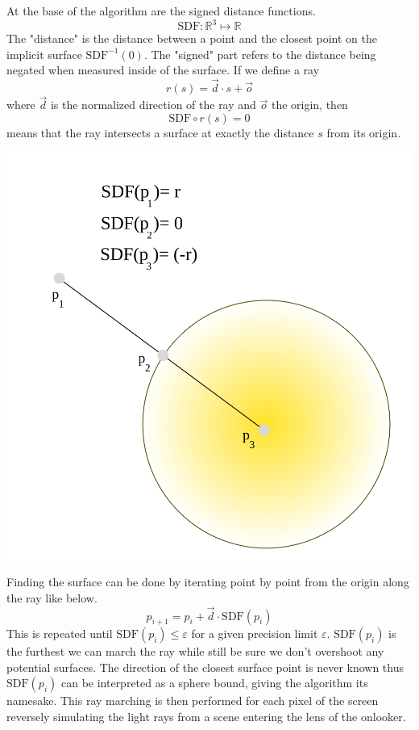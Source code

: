 \begin{minipage}{0.6\textwidth} 

    At the base of the algorithm are the signed distance functions.
    $$\text{SDF}:\mathbb{R}^{3}\mapsto\mathbb{R}$$ The "distance" is the
    distance between a point and the closest point on the implicit surface
    $\text{SDF}^{-1}(0)$. The "signed" part refers to the distance being
    negated when measured inside of the surface.  If we define a ray $$r(s) =
    \vec{d} \cdot s + \vec{o}$$ where $\vec{d}$ is the normalized direction of
    the ray and $\vec{o}$ the origin, then $$\text{SDF}\circ r(s) = 0$$ means
    that the ray intersects a surface at exactly the distance $s$ from its
    origin.

\end{minipage} 
\hfill
\begin{minipage}{0.3\textwidth}
    \includegraphics[width=\linewidth]{figure/SDF} 
\end{minipage}

\bigskip

Finding the surface can be done by iterating point by point from the origin
along the ray like below. $$p_{i+1} = p_i + \vec{d}\cdot \text{SDF}(p_i)$$ This is
repeated until $\text{SDF}(p_i) \leq \varepsilon$ for a given precision limit
$\varepsilon$. $\text{SDF}(p_i)$ is the furthest we can march the ray while
still be sure we don't overshoot any potential surfaces.  The direction of the
closest surface point is never known thus $\text{SDF}(p_i)$ can be interpreted
as a sphere bound, giving the algorithm its namesake. This ray marching is then
performed for each pixel of the screen reversely simulating the light rays from a
scene entering the lens of the onlooker.
	
